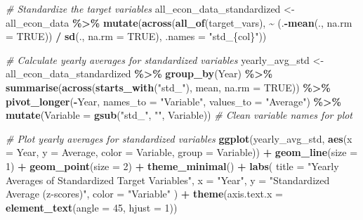 \documentclass[
]{article}
\newenvironment{Shaded}{\begin{snugshade}}{\end{snugshade}}
\newcommand{\AttributeTok}[1]{\textcolor[rgb]{0.13,0.29,0.53}{#1}}
\newcommand{\CommentTok}[1]{\textcolor[rgb]{0.56,0.35,0.01}{\textit{#1}}}
\newcommand{\ConstantTok}[1]{\textcolor[rgb]{0.56,0.35,0.01}{#1}}
\newcommand{\DecValTok}[1]{\textcolor[rgb]{0.00,0.00,0.81}{#1}}
\newcommand{\FunctionTok}[1]{\textcolor[rgb]{0.13,0.29,0.53}{\textbf{#1}}}
\newcommand{\NormalTok}[1]{#1}
\newcommand{\OtherTok}[1]{\textcolor[rgb]{0.56,0.35,0.01}{#1}}
\newcommand{\SpecialCharTok}[1]{\textcolor[rgb]{0.81,0.36,0.00}{\textbf{#1}}}
\newcommand{\StringTok}[1]{\textcolor[rgb]{0.31,0.60,0.02}{#1}}
\begin{document}
\begin{Shaded}
\begin{Highlighting}[]
\CommentTok{\# Standardize the target variables}
\NormalTok{all\_econ\_data\_standardized }\OtherTok{\textless{}{-}}\NormalTok{ all\_econ\_data }\SpecialCharTok{\%\textgreater{}\%}
  \FunctionTok{mutate}\NormalTok{(}\FunctionTok{across}\NormalTok{(}\FunctionTok{all\_of}\NormalTok{(target\_vars), }\SpecialCharTok{\textasciitilde{}}\NormalTok{ (.}\SpecialCharTok{{-}}\FunctionTok{mean}\NormalTok{(., }\AttributeTok{na.rm =} \ConstantTok{TRUE}\NormalTok{)) }\SpecialCharTok{/} \FunctionTok{sd}\NormalTok{(., }\AttributeTok{na.rm =} \ConstantTok{TRUE}\NormalTok{), }
                \AttributeTok{.names =} \StringTok{"std\_\{col\}"}\NormalTok{))}

\CommentTok{\# Calculate yearly averages for standardized variables}
\NormalTok{yearly\_avg\_std }\OtherTok{\textless{}{-}}\NormalTok{ all\_econ\_data\_standardized }\SpecialCharTok{\%\textgreater{}\%}
  \FunctionTok{group\_by}\NormalTok{(Year) }\SpecialCharTok{\%\textgreater{}\%}
  \FunctionTok{summarise}\NormalTok{(}\FunctionTok{across}\NormalTok{(}\FunctionTok{starts\_with}\NormalTok{(}\StringTok{"std\_"}\NormalTok{), mean, }\AttributeTok{na.rm =} \ConstantTok{TRUE}\NormalTok{)) }\SpecialCharTok{\%\textgreater{}\%}
  \FunctionTok{pivot\_longer}\NormalTok{(}\SpecialCharTok{{-}}\NormalTok{Year, }\AttributeTok{names\_to =} \StringTok{"Variable"}\NormalTok{, }\AttributeTok{values\_to =} \StringTok{"Average"}\NormalTok{) }\SpecialCharTok{\%\textgreater{}\%}
  \FunctionTok{mutate}\NormalTok{(}\AttributeTok{Variable =} \FunctionTok{gsub}\NormalTok{(}\StringTok{"std\_"}\NormalTok{, }\StringTok{""}\NormalTok{, Variable))  }\CommentTok{\# Clean variable names for plot}

\CommentTok{\# Plot yearly averages for standardized variables}
\FunctionTok{ggplot}\NormalTok{(yearly\_avg\_std, }\FunctionTok{aes}\NormalTok{(}\AttributeTok{x =}\NormalTok{ Year, }\AttributeTok{y =}\NormalTok{ Average, }\AttributeTok{color =}\NormalTok{ Variable, }\AttributeTok{group =}\NormalTok{ Variable)) }\SpecialCharTok{+}
  \FunctionTok{geom\_line}\NormalTok{(}\AttributeTok{size =} \DecValTok{1}\NormalTok{) }\SpecialCharTok{+}
  \FunctionTok{geom\_point}\NormalTok{(}\AttributeTok{size =} \DecValTok{2}\NormalTok{) }\SpecialCharTok{+}
  \FunctionTok{theme\_minimal}\NormalTok{() }\SpecialCharTok{+}
  \FunctionTok{labs}\NormalTok{(}
    \AttributeTok{title =} \StringTok{"Yearly Averages of Standardized Target Variables"}\NormalTok{,}
    \AttributeTok{x =} \StringTok{"Year"}\NormalTok{,}
    \AttributeTok{y =} \StringTok{"Standardized Average (z{-}scores)"}\NormalTok{,}
    \AttributeTok{color =} \StringTok{"Variable"}
\NormalTok{  ) }\SpecialCharTok{+}
  \FunctionTok{theme}\NormalTok{(}\AttributeTok{axis.text.x =} \FunctionTok{element\_text}\NormalTok{(}\AttributeTok{angle =} \DecValTok{45}\NormalTok{, }\AttributeTok{hjust =} \DecValTok{1}\NormalTok{))}
\end{Highlighting}
\end{Shaded}
\end{document}
